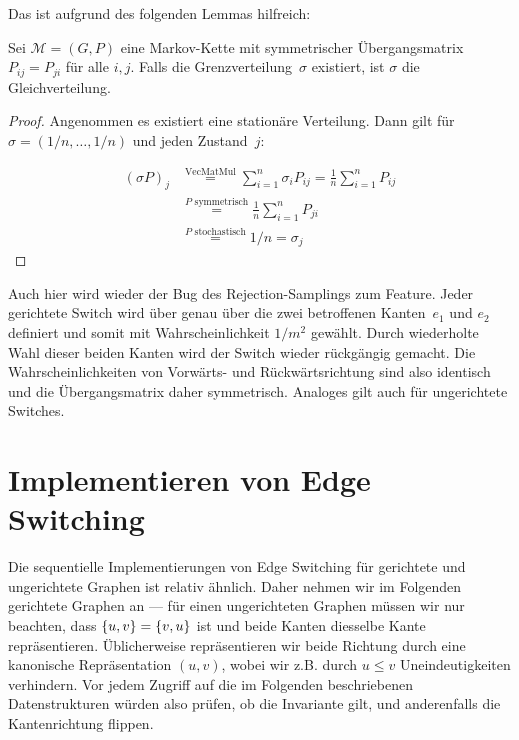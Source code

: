 Das ist aufgrund des folgenden Lemmas hilfreich:
\begin{lemma}
    Sei $\mathcal M = (G, P)$ eine Markov-Kette mit symmetrischer Übergangsmatrix $P_{ij} = P_{ji}$ für alle $i, j$.
    Falls die Grenzverteilung~$\sigma$ existiert, ist $\sigma$ die Gleichverteilung.
\end{lemma}

\begin{proof}
    Angenommen es existiert eine stationäre Verteilung.
    Dann gilt für $\sigma = (1/n, \ldots, 1/n)$ und jeden Zustand~$j$:

    \begin{align}
        (\sigma P) _ j & \stackrel{\text{VecMatMul}}{=} \sum_{i=1}^n \sigma_i P_{ij}
        = \frac 1 n \sum_{i=1}^n P_{ij}                                                   \\
                       & \stackrel{P\text{ symmetrisch}}{=} \frac 1 n \sum_{i=1}^n P_{ji} \\
                       & \stackrel{P\text{ stochastisch}}{=} 1 / n = \sigma_j
    \end{align}
\end{proof}

Auch hier wird wieder der Bug des Rejection-Samplings zum Feature.
Jeder gerichtete Switch wird über genau über die zwei betroffenen Kanten~$e_1$ und $e_2$ definiert und somit mit Wahrscheinlichkeit $1/m^2$ gewählt.
Durch wiederholte Wahl dieser beiden Kanten wird der Switch wieder rückgängig gemacht.
Die Wahrscheinlichkeiten von Vorwärts- und Rückwärtsrichtung sind also identisch und die Übergangsmatrix daher symmetrisch.
Analoges gilt auch für ungerichtete Switches.

\section{Implementieren von Edge Switching}
Die sequentielle Implementierungen von Edge Switching für gerichtete und ungerichtete Graphen ist relativ ähnlich.
Daher nehmen wir im Folgenden gerichtete Graphen an --- für einen ungerichteten Graphen müssen wir nur beachten, dass $\left\{u, v\right\} = \left\{v, u\right\}$ ist und beide Kanten diesselbe Kante repräsentieren.
Üblicherweise repräsentieren wir beide Richtung durch eine kanonische Repräsentation $(u, v)$, wobei wir z.B. durch $u \le v$ Uneindeutigkeiten verhindern.
Vor jedem Zugriff auf die im Folgenden beschriebenen Datenstrukturen würden also prüfen, ob die Invariante gilt, und anderenfalls die Kantenrichtung flippen.

